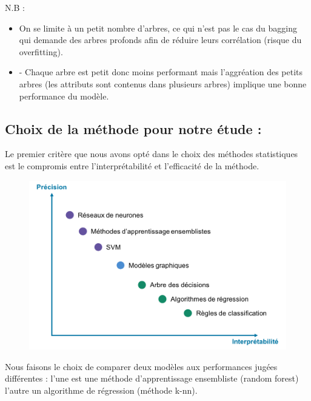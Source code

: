 \documentclass[11pt]{article}
\begin{document}
N.B :
\begin{itemize}
    \item On se limite à un petit nombre d'arbres, ce qui n'est pas le cas du bagging qui demande des arbres profonds afin de réduire leurs corrélation (risque du overfitting).

    \item - Chaque arbre est petit donc moins performant mais l'aggréation des petits arbres (les attributs sont contenus dans plusieurs arbres) implique une bonne performance du modèle.
\end{itemize}


\subsection{Choix de la méthode pour notre étude : }

Le premier critère que nous avons opté dans le choix des méthodes statistiques est le compromis entre l'interprétabilité et l'efficacité de la méthode.\par

\begin{figure}[hbt!]
    \centering
    \includegraphics[width= 17 cm]{./figures/acc_vs_int.png}
    \caption{}
\end{figure}

Nous faisons le choix de comparer deux modèles aux performances jugées différentes : l'une est une méthode d'apprentissage ensembliste (random forest) l'autre un algorithme de régression (méthode k-nn).\par
\end{document}
